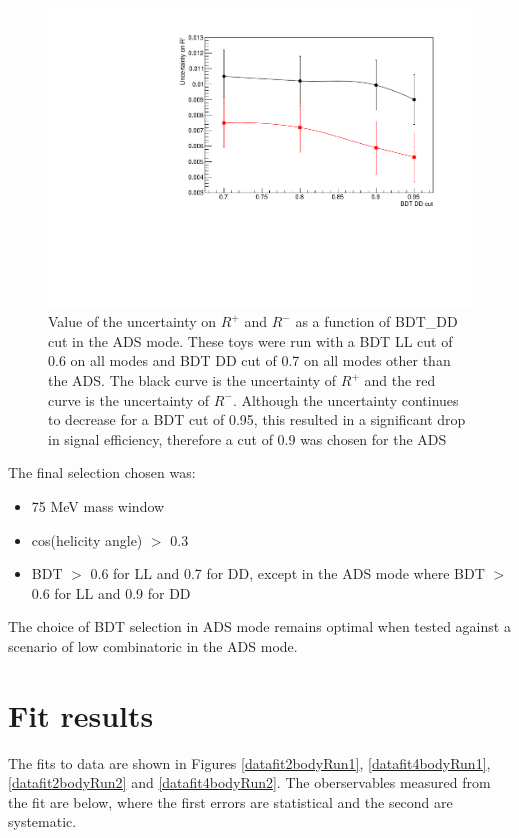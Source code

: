 \begin{figure}
\includegraphics[width=\linewidth]{figures/selection/ADSoptimisation.pdf}
\caption{Value of the uncertainty on $R^+$ and $R^-$ as a function of BDT\_DD cut in the ADS mode. These toys were run with a BDT LL cut of 0.6 on all modes and BDT DD cut of 0.7 on all modes other than the ADS. The black curve is the uncertainty of $R^+$ and the red curve is the uncertainty of $R^-$. Although the uncertainty continues to decrease for a BDT cut of 0.95, this resulted in a significant drop in signal efficiency, therefore a cut of 0.9 was chosen for the ADS}
\label{adsoptimisation}
\end{figure}

The final selection chosen was:

\begin{itemize}
\item{75 MeV \Kstar mass window}
\item{\textbar cos(\KS helicity angle) \textbar $>$ 0.3}
\item{BDT $>$ 0.6 for LL and 0.7 for DD, except in the ADS mode where BDT $>$ 0.6 for LL and 0.9 for DD}
\end{itemize}

The choice of BDT selection in ADS mode remains optimal when tested against a scenario of low combinatoric in the ADS mode. 

\section{Fit results}
\label{sec:cpfit:results}

The fits to data are shown in Figures \ref{datafit2bodyRun1}, \ref{datafit4bodyRun1}, \ref{datafit2bodyRun2} and \ref{datafit4bodyRun2}. The \CP oberservables measured from the fit are below, where the first errors are statistical and the second are systematic.


